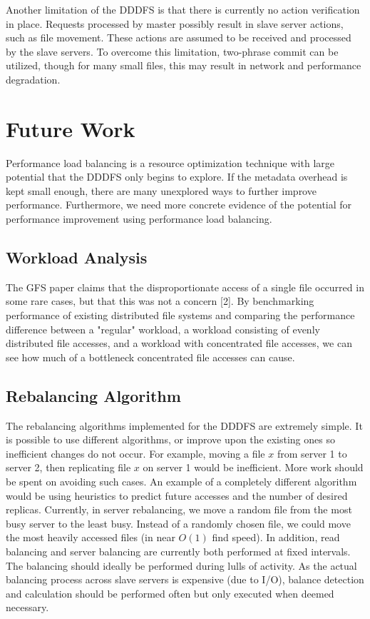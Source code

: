 \documentclass[twoside]{article}
\begin{document}
\begin{multicols}{2}
Another limitation of the DDDFS is that there is currently no action verification in place. Requests processed by master possibly result in slave server actions, such as file movement. These actions are assumed to be received and processed by the slave servers. To overcome this limitation, two-phrase commit can be utilized, though for many small files, this may result in network and performance degradation.

\section{Future Work}

Performance load balancing is a resource optimization technique with large potential that the DDDFS only begins to explore. If the metadata overhead is kept small enough, there are many unexplored ways to further improve performance. Furthermore, we need more concrete evidence of the potential for performance improvement using performance load balancing.

\subsection*{Workload Analysis}
The GFS paper claims that the disproportionate access of a single file occurred in some rare cases, but that this was not a concern [2]. By benchmarking performance of existing distributed file systems and comparing the performance difference between a "regular" workload, a workload consisting of evenly distributed file accesses, and a workload with concentrated file accesses, we can see how much of a bottleneck concentrated file accesses can cause.

\subsection*{Rebalancing Algorithm}
The rebalancing algorithms implemented for the DDDFS are extremely simple. It is possible to use different algorithms, or improve upon the existing ones so inefficient changes do not occur. For example, moving a file $x$ from server 1 to server 2, then replicating file $x$ on server 1 would be inefficient. More work should be spent on avoiding such cases. An example of a completely different algorithm would be using heuristics to predict future accesses and the number of desired replicas. Currently, in server rebalancing, we move a random file from the most busy server to the least busy. Instead of a randomly chosen file, we could move the most heavily accessed files (in near $O(1)$ find speed). In addition, read balancing and server balancing are currently both performed at fixed intervals. The balancing should ideally be performed during lulls of activity. As the actual balancing process across slave servers is expensive (due to I/O), balance detection and calculation should be performed often but only executed when deemed necessary. 


\end{multicols}
\end{document}
